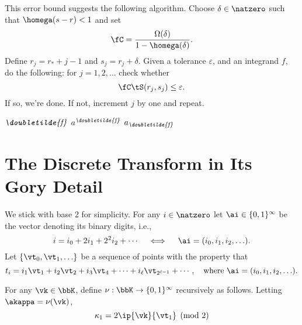 \documentclass[]{elsarticle}
\newcommand{\fudge}{\fC}
\newcommand{\dtf}{\textit{\doubletilde{f}}}
\begin{document}
This error bound suggests the following algorithm.  Choose $\delta \in \natzero$ such that $\homega(s-r)<1$ and set 
\[
\fudge = \frac{\Omega(\delta)}{1 - \homega(\delta)}.
\]
Define $r_j=r_*+j-1$ and $s_j=r_j+\delta$.  Given a tolerance $\varepsilon$, and an integrand $f$, do the following:  for $j=1, 2, \ldots$ check whether
\[
\fudge \tS(r_j,s_j) \le \varepsilon.
\]
If so, we're done.  If not, increment $j$ by one and repeat.


$\dtf$ $a^{\dtf}$ $a_{\dtf}$

\section{The Discrete Transform in Its Gory Detail}

We stick with base $2$ for simplicity.  For any $i\in \natzero$ let $\ai \in \{0,1\}^\infty$ be the vector denoting its binary digits, i.e., 
\[
i=i_0+2i_1+2^2i_2+ \cdots \quad \iff \quad \ai=(i_0,i_1,i_2, \ldots ).
\]
Let $\{\vt_0, \vt_1, \ldots\}$ be a sequence of points with the property that 
\[
t_i= i_1 \vt_1 +i_2 \vt_2 + i_3 \vt_4 + \cdots + i_\ell \vt_{2^{\ell-1}} + \cdots, \quad \text{where } \ai=(i_0,i_1,i_2, \ldots ).
\]

For any $\vk \in \bbK$, define $\nu: \bbK \to  \{0,1\}^\infty$ recursively as follows. Letting $\akappa=\nu(\vk)$, 
\[
\kappa_1 = 2\ip{\vk}{\vt_1} \pmod 2
\]  




\end{document}
